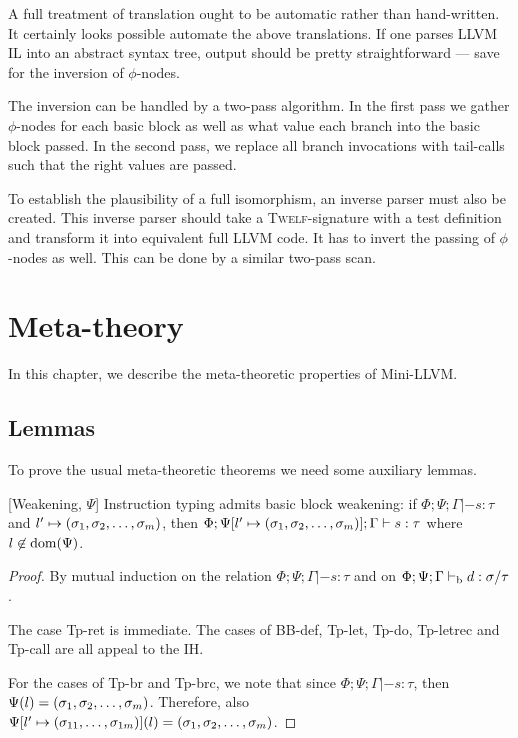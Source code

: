 \documentclass[a4paper, oneside, 10pt, final]{memoir}
\newcommand{\twelf}{\textsc{Twelf}}
\begin{document}
A full treatment of translation ought to be automatic rather than
hand-written. It certainly looks possible automate the above
translations. If one parses LLVM IL into an abstract syntax tree,
output should be pretty straightforward --- save for the inversion of
$\phi$-nodes.

The inversion can be handled by a two-pass algorithm. In the first
pass we gather $\phi$-nodes for each basic block as well as what value
each branch into the basic block passed. In the second pass, we
replace all branch invocations with tail-calls such that the right
values are passed.

To establish the plausibility of a full isomorphism, an inverse parser
must also be created. This inverse parser should take a
\twelf{}-signature with a test definition and transform it into
equivalent full LLVM code. It has to invert the passing of
$\phi$-nodes as well. This can be done by a similar two-pass scan.

\chapter{Meta-theory}

In this chapter, we describe the meta-theoretic properties of
Mini-LLVM.

\section{Lemmas}

To prove the usual meta-theoretic theorems we need some auxiliary
lemmas.

\begin{lem}{[Weakening, $\Psi$]}
  \label{lem:weaken-psi}
  Instruction typing admits basic block weakening: if $\Phi;\Psi;\Gamma
  |- s : \tau$ and $l' \mapsto (\sigma_1, \sigma_2, \dotsc, \sigma_m)$, then $\Phi;\Psi[l' \mapsto
  (\sigma_1, \sigma_2, \dotsc, \sigma_m)];\Gamma |- s : \tau$ where $l \not \in \mathrm{dom}(\Psi)$.
\end{lem}
\begin{proof}
  By mutual induction on the relation $\Phi;\Psi;\Gamma |- s : \tau$
  and on $\Phi;\Psi;\Gamma |-_{\mathrm{b}} d : \sigma / \tau$.

  The case Tp-ret is immediate. The cases of BB-def, Tp-let, Tp-do,
  Tp-letrec and Tp-call are all appeal to the IH.

  For the cases of Tp-br and Tp-brc, we note that since
  $\Phi;\Psi;\Gamma |- s : \tau$, then $\Psi(l) =
  (\sigma_1, \sigma_2, \dotsc, \sigma_m)$. Therefore, also $\Psi[l' \mapsto (\sigma_{11}, \dotsc,
  \sigma_{1m})](l) = (\sigma_1, \sigma_2, \dotsc, \sigma_m)$.
\end{proof}
\end{document}
